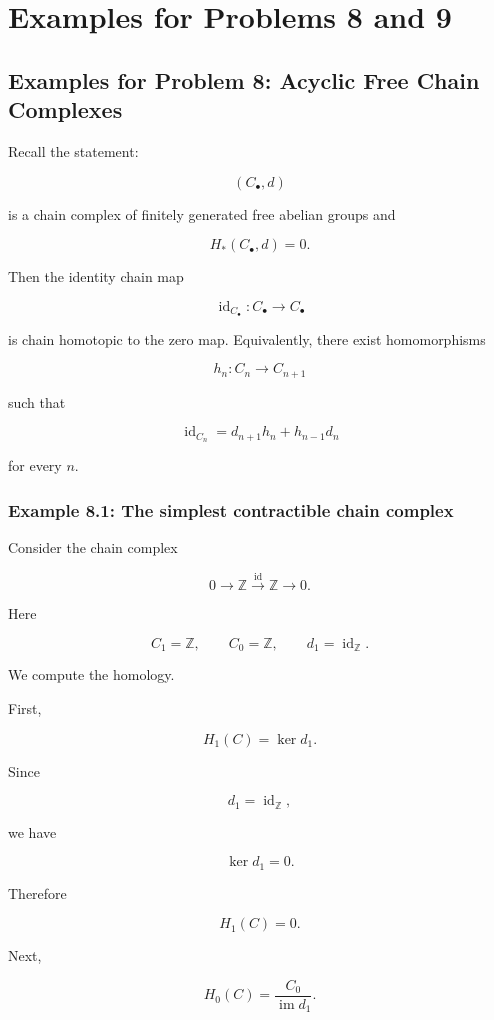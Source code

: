 \documentclass[12pt,a4paper]{article}
\theoremstyle{notespace}
\begin{document}
\section{Examples for Problems 8 and 9}

\subsection{Examples for Problem 8: Acyclic Free Chain Complexes}

Recall the statement:

\[
(C_\bullet,d)
\]

is a chain complex of finitely generated free abelian groups and

\[
H_*(C_\bullet,d)=0.
\]

Then the identity chain map

\[
\operatorname{id}_{C_\bullet}\colon C_\bullet\to C_\bullet
\]

is chain homotopic to the zero map. Equivalently, there exist homomorphisms

\[
h_n\colon C_n\to C_{n+1}
\]

such that

\[
\operatorname{id}_{C_n}=d_{n+1}h_n+h_{n-1}d_n
\]

for every \(n\).

\subsubsection{Example 8.1: The simplest contractible chain complex}

Consider the chain complex

\[
0\longrightarrow \mathbb Z
\xrightarrow{\operatorname{id}}
\mathbb Z
\longrightarrow 0.
\]

Here

\[
C_1=\mathbb Z,
\qquad
C_0=\mathbb Z,
\qquad
d_1=\operatorname{id}_{\mathbb Z}.
\]

We compute the homology.

First,

\[
H_1(C)=\ker d_1.
\]

Since

\[
d_1=\operatorname{id}_{\mathbb Z},
\]

we have

\[
\ker d_1=0.
\]

Therefore

\[
H_1(C)=0.
\]

Next,

\[
H_0(C)=\frac{C_0}{\operatorname{im} d_1}.
\]
\end{document}
